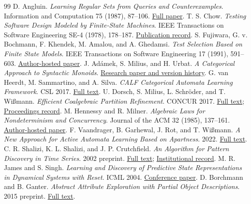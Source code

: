 \documentclass[11pt]{article}
\theoremstyle{remark}
\begin{document}
\begin{thebibliography}{99}
 D. Angluin. \emph{Learning Regular Sets from Queries and Counterexamples}. Information and Computation 75 (1987), 87--106. \href{https://people.eecs.berkeley.edu/~dawnsong/teaching/s10/papers/angluin87.pdf}{Full paper}.
 T. S. Chow. \emph{Testing Software Design Modeled by Finite-State Machines}. IEEE Transactions on Software Engineering SE-4 (1978), 178--187. \href{https://doi.org/10.1109/TSE.1978.231496}{Publication record}.
 S. Fujiwara, G. v. Bochmann, F. Khendek, M. Amalou, and A. Ghedamsi. \emph{Test Selection Based on Finite State Models}. IEEE Transactions on Software Engineering 17 (1991), 591--603. \href{https://www.site.uottawa.ca/~bochmann/Curriculum/Pub/1991%20-%20Test%20selection%20based%20on%20finite%20state%20models.pdf}{Author-hosted paper}.
 J. Ad\'amek, S. Milius, and H. Urbat. \emph{A Categorical Approach to Syntactic Monoids}. \href{https://arxiv.org/abs/1804.03011}{Research paper and version history}.
 G. van Heerdt, M. Sammartino, and A. Silva. \emph{CALF Categorical Automata Learning Framework}. CSL 2017. \href{https://arxiv.org/html/1704.05676}{Full text}.
 U. Dorsch, S. Milius, L. Schr\"oder, and T. Wi\ss mann. \emph{Efficient Coalgebraic Partition Refinement}. CONCUR 2017. \href{https://arxiv.org/html/1705.08362}{Full text}; \href{https://drops.dagstuhl.de/entities/document/10.4230/LIPIcs.CONCUR.2017.32}{Proceedings record}.
 M. Hennessy and R. Milner. \emph{Algebraic Laws for Nondeterminism and Concurrency}. Journal of the ACM 32 (1985), 137--161. \href{https://www.scss.tcd.ie/matthew.hennessy/pubs/old/HMjacm85.pdf}{Author-hosted paper}.
 F. Vaandrager, B. Garhewal, J. Rot, and T. Wi\ss mann. \emph{A New Approach for Active Automata Learning Based on Apartness}. 2022. \href{https://arxiv.org/html/2107.05419}{Full text}.
 C. R. Shalizi, K. L. Shalizi, and J. P. Crutchfield. \emph{An Algorithm for Pattern Discovery in Time Series}. 2002 preprint. \href{https://arxiv.org/html/cs/0210025}{Full text}; \href{https://escholarship.org/uc/item/9fz0f94d}{Institutional record}.
 M. R. James and S. Singh. \emph{Learning and Discovery of Predictive State Representations in Dynamical Systems with Reset}. ICML 2004. \href{https://icml.cc/Conferences/2004/proceedings/papers/117.pdf}{Conference paper}.
 D. Borchmann and B. Ganter. \emph{Abstract Attribute Exploration with Partial Object Descriptions}. 2015 preprint. \href{https://arxiv.org/html/1511.06191}{Full text}.

\end{thebibliography}
\end{document}
